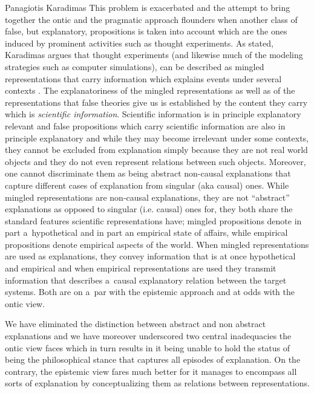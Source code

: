 \begin{artengenv}{Panagiotis Karadimas}
This problem is exacerbated and the attempt to bring together the ontic and the pragmatic approach flounders when another class of false, but explanatory, propositions is taken into account which are the ones induced by prominent activities such as thought experiments. As stated, Karadimas argues that thought experiments (and likewise much of the modeling strategies such as computer simulations), can be described as mingled representations that carry information which explains events under several contexts
\parencite[][]{karadimas_thought_2022}. %
 The explanatoriness of the mingled representations as well as of the representations that false theories give us is established by the content they carry which is \textit{scientific information}. Scientific information is in principle explanatory relevant 
\parencites[][]{van_fraassen_scientific_1980}[][]{richardson_explanation_1995} %
 and false propositions which carry scientific information are also in principle explanatory and while they may become irrelevant under some contexts, they cannot be excluded from explanation simply because they are not real world objects and they do not even represent relations between such objects. Moreover, one cannot discriminate them as being abstract non-causal explanations that capture different cases of explanation from singular (aka causal) ones. While mingled representations are non-causal explanations, they are not ``abstract'' explanations as opposed to singular (i.e. causal) ones for, they both share the standard features scientific representations have; mingled propositions denote in part a~hypothetical and in part an empirical state of affairs, while empirical propositions denote empirical aspects of the world. When mingled representations are used as explanations, they convey information that is at once hypothetical and empirical and when empirical representations are used they transmit information that describes a~causal explanatory relation between the target systems. Both are on a~par with the epistemic approach and at odds with the ontic view.

We have eliminated the distinction between abstract and non abstract explanations and we have moreover underscored two central inadequacies the ontic view faces which in turn results in it being unable to hold the status of being the philosophical stance that captures all episodes of explanation. On the contrary, the epistemic view fares much better for it manages to encompass all sorts of explanation by conceptualizing them as relations between representations.


\end{artengenv}

